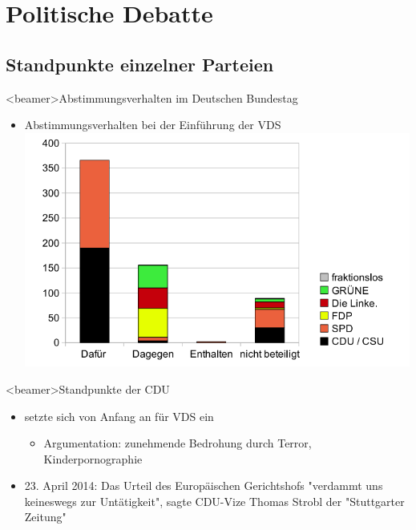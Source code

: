 \section{Politische Debatte}
  \subsection{Standpunkte einzelner Parteien}
        \begin{frame}<beamer>{Abstimmungsverhalten im Deutschen Bundestag}
\begin{itemize}
        \item Abstimmungsverhalten bei der Einführung der VDS
        \includegraphics[height=0.9\textheight]{sections/img/abstimmung.png}
    \end{itemize}
    \end{frame}
  
  
    \begin{frame}<beamer>{Standpunkte der CDU}
       \begin{itemize}
        \item setzte sich von Anfang an für VDS ein
        \begin{itemize}
        \item Argumentation: zunehmende Bedrohung durch Terror, Kinderpornographie
         \end{itemize}
        \item 23. April 2014: Das Urteil des Europäischen Gerichtshofs "verdammt uns keineswegs zur Untätigkeit", sagte CDU-Vize Thomas Strobl der "Stuttgarter Zeitung" 
  
      \end{itemize}
    \end{frame}

